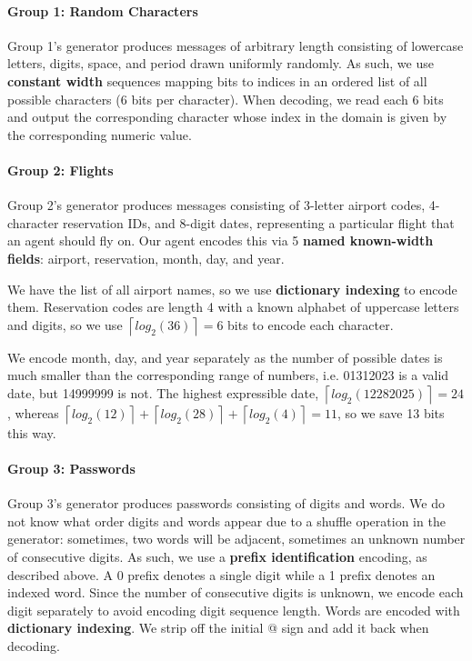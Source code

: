 \documentclass[titlepage]{article}
\begin{document}
\paragraph{Group 1: Random Characters}
Group 1's generator produces messages of arbitrary length consisting of lowercase letters, digits, space, and period drawn uniformly randomly. As such, we use \textbf{constant width} sequences mapping bits to indices in an ordered list of all possible characters (6 bits per character). When decoding, we read each 6 bits and output the corresponding character whose index in the domain is given by the corresponding numeric value.

\paragraph{Group 2: Flights}
Group 2's generator produces messages consisting of 3-letter airport codes, 4-character reservation IDs, and 8-digit dates, representing a particular flight that an agent should fly on. Our agent encodes this via 5 \textbf{named known-width fields}: airport, reservation, month, day, and year.

We have the list of all airport names, so we use \textbf{dictionary indexing} to encode them. Reservation codes are length 4 with a known alphabet of uppercase letters and digits, so we use $\left\lceil log_2(36)\right\rceil = 6$ bits to encode each character.

We encode month, day, and year separately as the number of possible dates is much smaller than the corresponding range of numbers, i.e. 01312023 is a valid date, but 14999999 is not. The highest expressible date, $\left\lceil{log_2(12282025)}\right\rceil = 24$, whereas $\left\lceil{log_2(12)}\right\rceil + \left\lceil{log_2(28)}\right\rceil + \left\lceil{log_2(4)}\right\rceil = 11$, so we save 13 bits this way.

\paragraph{Group 3: Passwords} Group 3's generator produces passwords consisting of digits and words. We do not know what order digits and words appear due to a shuffle operation in the generator: sometimes, two words will be adjacent, sometimes an unknown number of consecutive digits. As such, we use a \textbf{prefix identification} encoding, as described above. A 0 prefix denotes a single digit while a 1 prefix denotes an indexed word. Since the number of consecutive digits is unknown, we encode each digit separately to avoid encoding digit sequence length. Words are encoded with \textbf{dictionary indexing}. We strip off the initial @ sign and add it back when decoding.
\end{document}
